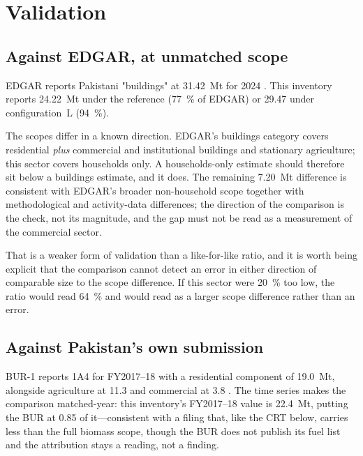 \section{Validation}
\label{sec:validation}

\subsection{Against EDGAR, at unmatched scope}

EDGAR reports Pakistani "buildings" at \SI{31.42}{\mega\tonne} \COe{} for 2024
\citep{edgar2025booklet}. This inventory reports \SI{24.22}{\mega\tonne} under the reference
(\SI{77}{\percent} of EDGAR) or \SI{29.47}{} under configuration~L (\SI{94}{\percent}).

The scopes differ in a known direction. EDGAR's buildings category covers residential
\emph{plus} commercial and institutional buildings and stationary agriculture; this sector
covers households only. A households-only estimate should therefore sit below a buildings
estimate, and it does. The remaining \SI{7.20}{\mega\tonne} difference is consistent with
EDGAR's broader non-household scope together with methodological and activity-data
differences; the direction of the comparison is the check, not its magnitude, and the gap
must not be read as a measurement of the commercial sector.

That is a weaker form of validation than a like-for-like ratio, and it is worth being explicit
that the comparison cannot detect an error in either direction of comparable size to the scope
difference. If this sector were \SI{20}{\percent} too low, the ratio would read
\SI{64}{\percent} and would read as a larger scope difference rather than an error.

\subsection{Against Pakistan's own submission}

BUR-1 reports 1A4 for FY2017--18 with a residential component of \SI{19.0}{\mega\tonne},
alongside agriculture at \SI{11.3}{} and commercial at \SI{3.8}{} \citep{pakbur1}. The time
series makes the comparison matched-year: this inventory's FY2017--18 value is
\SI{22.4}{\mega\tonne}, putting the BUR at \num{0.85} of it---consistent with a filing that,
like the CRT below, carries less than the full biomass scope, though the BUR does not publish
its fuel list and the attribution stays a reading, not a finding.

